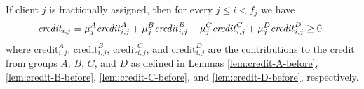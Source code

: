 \begin{lemma}\label{lem:credit-fractional-before}
    If client $j$ is fractionally assigned, then for every $j \leq i < f_j$ we have
    \begin{equation*}
        \text{\emph{credit}}_{i,j} = 
        \mu_j^A\text{\emph{credit}}_{i,j}^A +
        \mu_j^B\text{\emph{credit}}_{i,j}^B +
        \mu_j^C\text{\emph{credit}}_{i,j}^C +
        \mu_j^D\text{\emph{credit}}_{i,j}^D \ge 0\,,
    \end{equation*}
    where $\text{credit}_{i,j}^A$, $\text{credit}_{i,j}^B$, $\text{credit}_{i,j}^C$, and $\text{credit}_{i,j}^D$ are the contributions to the credit from groups $A$, $B$, $C$, and $D$ as defined in Lemmas \ref{lem:credit-A-before}, \ref{lem:credit-B-before}, \ref{lem:credit-C-before}, and \ref{lem:credit-D-before}, respectively.
\end{lemma}
